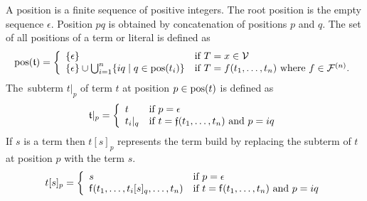 \begin{definition}\label{def:position}
	A {\myem position} is a finite sequence of positive integers.
	The root position is the empty sequence $\epsilon$.
	Position $pq$ is obtained by concatenation of positions $p$ and $q$.
	The set of all positions of a term or literal is defined as 
	\begin{gather*}
	\operatorname{pos}({\mathfrak t}) = \left\{\begin{array}{ll}
	\{ \epsilon \} 		
	& \text{if }T = x \in {\mathcal V}
	\\
	\{ \epsilon \} \cup \bigcup_{i=1}^{n} \{ iq\mid q\in\operatorname{pos}(t_i) \}	
	& \text{if }T=f(t_1,\ldots,t_n)\text{ where } f\in{\mathcal F}^{(n)}.
	\end{array}\right.
	\end{gather*}
The~{\myem subterm} $t|_p$ of term $t$ {\myem at position} $p\in\operatorname{pos}(t)$ is defined as
\begin{gather*}
{\mathfrak t}|_p = \left\{\begin{array}{ll}
		t 		& \text{if }p=\epsilon \\
		t_i|_q	& \text{if }t={\mathfrak f}(t_1,\ldots,t_n)\text{ and }p=iq
	\end{array}\right.
\end{gather*}
%
If $s$ is a term then $t[s]_p$ represents the term build by replacing the subterm of $t$ at position $p$ with the term $s$.
\begin{gather*}
t[s]_p = \left\{\begin{array}{ll}
		s 		& \text{if }p=\epsilon \\
		{\mathsf f}(t_1,\ldots,t_i[s]_q,\ldots,t_n)	& \text{if }t={\mathsf f}(t_1,\ldots,t_n)\text{ and }p=iq
	\end{array}\right.
\end{gather*}
\end{definition}

